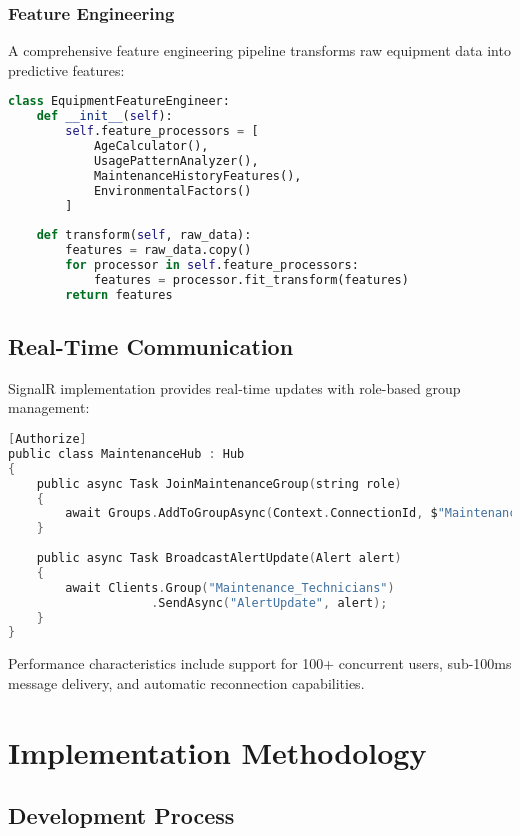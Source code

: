 \documentclass[12pt,a4paper]{report}
\begin{document}
\subsection{Feature Engineering}

A comprehensive feature engineering pipeline transforms raw equipment data into predictive features:

\begin{lstlisting}[language=Python, caption=Feature Engineering Pipeline]
class EquipmentFeatureEngineer:
    def __init__(self):
        self.feature_processors = [
            AgeCalculator(),
            UsagePatternAnalyzer(), 
            MaintenanceHistoryFeatures(),
            EnvironmentalFactors()
        ]
    
    def transform(self, raw_data):
        features = raw_data.copy()
        for processor in self.feature_processors:
            features = processor.fit_transform(features)
        return features
\end{lstlisting}

\section{Real-Time Communication}

SignalR implementation provides real-time updates with role-based group management:

\begin{lstlisting}[language=C, caption=SignalR Hub Implementation]
[Authorize]
public class MaintenanceHub : Hub
{
    public async Task JoinMaintenanceGroup(string role)
    {
        await Groups.AddToGroupAsync(Context.ConnectionId, $"Maintenance_{role}");
    }
    
    public async Task BroadcastAlertUpdate(Alert alert)
    {
        await Clients.Group("Maintenance_Technicians")
                    .SendAsync("AlertUpdate", alert);
    }
}
\end{lstlisting}

Performance characteristics include support for 100+ concurrent users, sub-100ms message delivery, and automatic reconnection capabilities.

\chapter{Implementation Methodology}

\section{Development Process}
\end{document}
